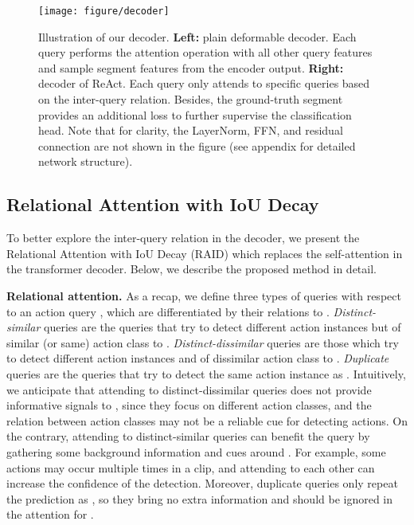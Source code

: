 \documentclass[runningheads]{llncs}
\newcommand{\myPara}[1]{\vspace{.05in}\noindent\textbf{#1}}
\begin{document}
\begin{figure}[t]
    \centering
\texttt{[image: figure/decoder]}
    \caption{Illustration of our decoder. \textbf{Left:} plain deformable decoder. Each query performs the attention operation with all other query features and sample segment features from the encoder output. \textbf{Right:} decoder of ReAct. Each query only attends to specific queries based on the inter-query relation. Besides, the ground-truth segment provides an additional loss to further supervise the classification head. Note that for clarity, the LayerNorm, FFN, and residual connection are not shown in the figure (see appendix for detailed network structure).}
    \label{fig:decoder}
     \vspace{-0.4cm}
\end{figure}


\subsection{Relational Attention with IoU Decay}\label{RAID_sec} To better explore the inter-query relation in the decoder, we present the Relational Attention with IoU Decay (RAID) which replaces the self-attention in the transformer decoder. 
Below, we describe the proposed method in detail.  



\myPara{Relational attention.} 
As a recap, we define three types of queries with respect to an action query , which are differentiated by their relations to .
\emph{Distinct-similar} queries are the queries that try to detect different action instances but of similar (or same) action class to . 
\emph{Distinct-dissimilar} queries are those which try to detect different action instances and of dissimilar action class to .
\emph{Duplicate} queries are the queries that try to detect the same action instance as .
Intuitively, we anticipate that attending to distinct-dissimilar queries does not provide informative signals to , since they focus on different action classes, and the relation between action classes may not be a reliable cue for detecting actions. On the contrary, attending to distinct-similar queries can benefit the query  by gathering some background information and cues around . For example, some actions may occur multiple times in a clip, and attending to each other can increase the confidence of the detection.
Moreover, duplicate queries only repeat the prediction as , so they bring no extra information and should be ignored in the attention for .
\end{document}
